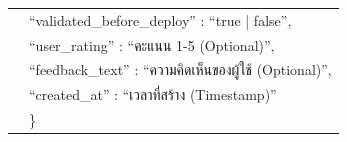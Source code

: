 \begin{table}[H]
\begin{tabularx}{\textwidth}{|l|L|}
                        & \hspace{1em} ``validated\_before\_deploy'' : ``true | false'', \nonumber \\
                        & \hspace{1em} ``user\_rating'' : ``คะแนน 1-5 (Optional)'', \nonumber \\
                        & \hspace{1em} ``feedback\_text'' : ``ความคิดเห็นของผู้ใช้ (Optional)'', \nonumber \\
                        & \hspace{1em} ``created\_at'' : ``เวลาที่สร้าง (Timestamp)'' \nonumber \\
                        & \} \\
        \hline
    \end{tabularx}
\end{table}


